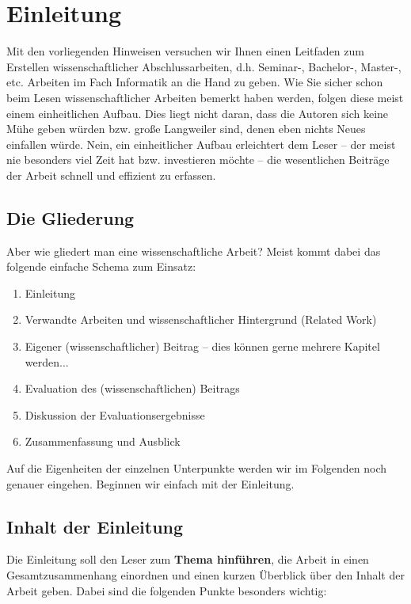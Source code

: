 \section{Einleitung}
\label{sec_einleitung}

\noindent
Mit den vorliegenden Hinweisen versuchen wir Ihnen einen Leitfaden zum Erstellen wissenschaftlicher Abschlussarbeiten, d.h. Seminar-, Bachelor-, Master-, etc. Arbeiten im Fach Informatik an die Hand zu geben.
Wie Sie sicher schon beim Lesen wissenschaftlicher Arbeiten bemerkt haben werden, folgen diese meist einem einheitlichen Aufbau.
Dies liegt nicht daran, dass die Autoren sich keine Mühe geben würden bzw. große Langweiler sind, denen eben nichts Neues einfallen würde.
Nein, ein einheitlicher Aufbau erleichtert dem Leser -- der meist nie besonders viel Zeit hat bzw. investieren möchte -- die wesentlichen Beiträge der Arbeit schnell und effizient zu erfassen.


\subsection{Die Gliederung}
Aber wie gliedert man eine wissenschaftliche Arbeit?
Meist kommt dabei das folgende einfache Schema zum Einsatz:
\begin{enumerate}
\item Einleitung
\item Verwandte Arbeiten und wissenschaftlicher Hintergrund (Related Work)
\item Eigener (wissenschaftlicher) Beitrag -- dies können gerne mehrere Kapitel werden...
\item Evaluation des (wissenschaftlichen) Beitrags
\item Diskussion der Evaluationsergebnisse
\item Zusammenfassung und Ausblick 
\end{enumerate}

Auf die Eigenheiten der einzelnen Unterpunkte werden wir im Folgenden noch genauer eingehen.
Beginnen wir einfach mit der Einleitung.

\subsection{Inhalt der Einleitung}
Die Einleitung soll den Leser zum {\bf Thema hinführen}, die Arbeit in einen Gesamtzusammenhang einordnen und einen kurzen Überblick über den Inhalt der Arbeit geben. 
Dabei sind die folgenden Punkte besonders wichtig:

